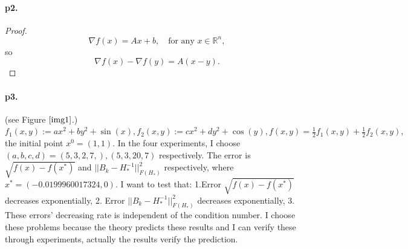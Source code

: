 \documentclass[12pt,a4paper]{article}
\begin{document}
	\paragraph{p2.}
	\begin{proof}
		\begin{equation*}
			\nabla f(x)= Ax+b, \quad \text{for any }x \in\mathbb{R}^n,
		\end{equation*}
	so 
	$$
	\nabla f(x)-\nabla f(y)=A(x-y).
	$$
	\end{proof}
	
	\paragraph{p3.}
	(see Figure $\ref{img1}$.)
	$f_1(x,y):=ax^2+by^2+\sin(x),f_2(x,y):=cx^2+dy^2+\cos(y), f(x,y)=\frac{1}{2}f_1(x,y)+\frac{1}{2}f_2(x,y),  $ the initial point $x^0=(1,1)$. In the four experiments, I choose $(a,b,c,d)=(5,3,2,7,),(5,3,20,7)$ respectively. The error is $\sqrt{f(x)-f(x^*)}$ and $||B_k-H_*^{-1}||^2_{F(H_*)}$ respectively, where $x^*=(-0.0199960017324,0)$. I want to test that: 1.Error $\sqrt{f(x)-f(x^*)}$ decreases exponentially, 2. Error $||B_k-H_*^{-1}||^2_{F(H_*)}$ decreases exponentially, 3. These errors' decreasing rate is independent of the condition number. I choose these problems
	because the theory predicts these results  and I can verify these through experiments, actually the results verify 
	the prediction.
\end{document}
